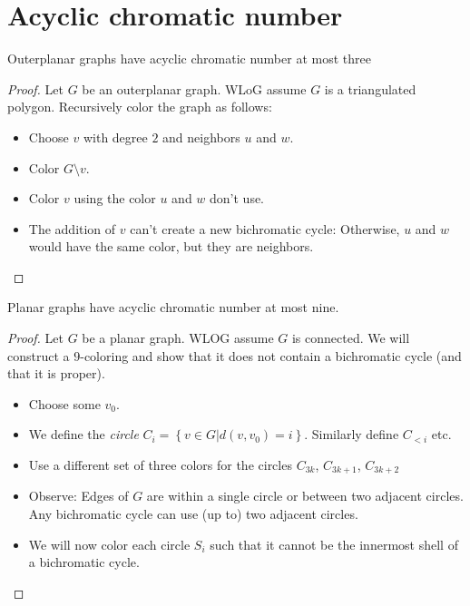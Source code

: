 \documentclass[t]{beamer}
\begin{document}
\section{Acyclic chromatic number}
\begin{frame}
    \begin{theorem}
	Outerplanar graphs have acyclic chromatic number at most three
    \end{theorem}
    \begin{proof}
	Let $G$ be an outerplanar graph. WLoG assume $G$ is a triangulated polygon. Recursively color the graph as follows:
	\begin{itemize}
	    \item Choose $v$ with degree $2$ and neighbors $u$ and $w$.
	    \item Color $G\setminus v$.
	    \item Color $v$ using the color $u$ and $w$ don't use. 
	    \item The addition of $v$ can't create a new bichromatic cycle: Otherwise, $u$ and $w$ would have the same color, but they are neighbors.
	\end{itemize}
    \end{proof}
\end{frame}

\begin{frame}
    \begin{theorem}
	Planar graphs have acyclic chromatic number at most nine.
    \end{theorem}
    \begin{proof}
	Let $G$ be a planar graph. WLOG assume $G$ is connected. We will construct a $9$-coloring and show that it does not contain a bichromatic cycle (and that it is proper).
	\begin{itemize}
	    \item Choose some $v_0$.
	    \item We define the \emph{circle} $C_i = \left\{v \in G | d(v, v_0)=i\right\}$. Similarly define $C_{<i}$ etc.
	    \item Use a different set of three colors for the circles $C_{3k}$, $C_{3k+1}$, $C_{3k+2}$
	    \item Observe: Edges of $G$ are within a single circle or between two adjacent circles. Any bichromatic cycle can use (up to) two adjacent circles. 
	    \item We will now color each circle $S_i$ such that it cannot be the innermost shell of a bichromatic cycle.
	\end{itemize}
	\phantom\qedhere
    \end{proof}
\end{frame}
\end{document}
